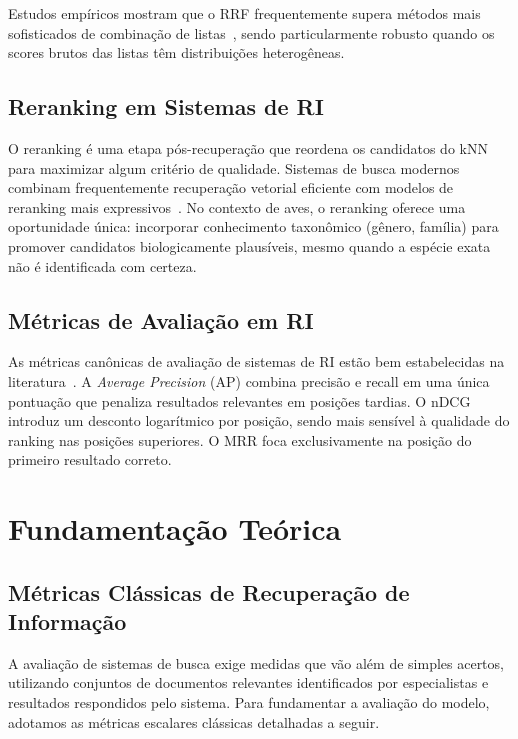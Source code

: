 \documentclass[12pt]{article}
\begin{document}
Estudos empíricos mostram que o RRF frequentemente supera métodos mais
sofisticados de combinação de listas~\cite{cormack:09}, sendo particularmente
robusto quando os scores brutos das listas têm distribuições heterogêneas.

\subsection{Reranking em Sistemas de RI}

O reranking é uma etapa pós-recuperação que reordena os candidatos do kNN para
maximizar algum critério de qualidade. Sistemas de busca modernos combinam
frequentemente recuperação vetorial eficiente com modelos de reranking mais
expressivos~\cite{baeza:99}. No contexto de aves, o reranking oferece uma
oportunidade única: incorporar conhecimento taxonômico (gênero, família) para
promover candidatos biologicamente plausíveis, mesmo quando a espécie exata
não é identificada com certeza.

\subsection{Métricas de Avaliação em RI}

As métricas canônicas de avaliação de sistemas de RI estão bem estabelecidas
na literatura~\cite{baeza:99, jarvelin:02}. A \textit{Average Precision} (AP)
combina precisão e recall em uma única pontuação que penaliza resultados
relevantes em posições tardias. O nDCG~\cite{jarvelin:02} introduz um desconto
logarítmico por posição, sendo mais sensível à qualidade do ranking nas posições
superiores. O MRR foca exclusivamente na posição do primeiro resultado correto.

\section{Fundamentação Teórica}
\label{sec:fund}

\subsection{Métricas Clássicas de Recuperação de Informação}
\label{sub:classicas_fund}

A avaliação de sistemas de busca exige medidas que vão além de simples acertos, utilizando conjuntos de documentos relevantes identificados por especialistas e resultados respondidos pelo sistema. Para fundamentar a avaliação do modelo, adotamos as métricas escalares clássicas detalhadas a seguir.
\end{document}
